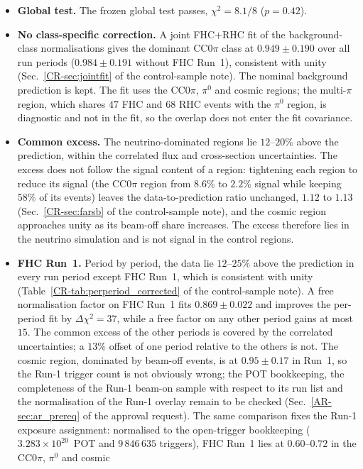\documentclass[11pt,a4paper]{article}
\newcommand{\crref}[2]{#1~\ref{CR-#2} of the control-sample note}
\begin{document}
\begin{itemize}\itemsep3pt
  \item \textbf{Global test.} The frozen global test passes, $\chi^2=8.1/8$ ($p=0.42$).
  \item \textbf{No class-specific correction.} A joint FHC$+$RHC fit of the background-class
    normalisations gives the dominant CC$0\pi$ class at $0.949\pm0.190$ over all run periods
    ($0.984\pm0.191$ without FHC Run~1), consistent with unity (\crref{Sec.}{sec:jointfit}). The
    nominal background prediction is kept. The fit uses the CC$0\pi$, $\pi^0$ and cosmic regions; the
    multi-$\pi$ region, which shares $47$ FHC and $68$ RHC events with the $\pi^0$ region, is
    diagnostic and not in the fit, so the overlap does not enter the fit covariance.
  \item \textbf{Common excess.} The neutrino-dominated regions lie $12$--$20\%$ above the prediction,
    within the correlated flux and cross-section uncertainties. The excess does not follow the
    signal content of a region: tightening each region to reduce its signal (the CC$0\pi$ region from
    $8.6\%$ to $2.2\%$ signal while keeping $58\%$ of its events) leaves the data-to-prediction ratio
    unchanged, $1.12$ to $1.13$ (\crref{Sec.}{sec:farsb}), and the cosmic region approaches unity as
    its beam-off share increases. The excess therefore lies in the neutrino simulation and is not
    signal in the control regions.
  \item \textbf{FHC Run~1.} Period by period, the data lie $12$--$25\%$ above the prediction in every
    run period except FHC Run~1, which is consistent with unity (\crref{Table}{tab:perperiod_corrected}).
    A free normalisation factor on FHC Run~1 fits $0.869\pm0.022$ and improves the per-period fit by
    $\Delta\chi^2=37$, while a free factor on any other period gains at most $15$. The common excess
    of the other periods is covered by the correlated uncertainties; a $13\%$ offset of one period
    relative to the others is not. The cosmic region, dominated by beam-off events, is at
    $0.95\pm0.17$ in Run~1, so the Run-1 trigger count is not obviously wrong; the POT bookkeeping,
    the completeness of the Run-1 beam-on sample with respect to its run list and the normalisation of
    the Run-1 overlay remain to be checked (Sec.~\ref{AR-sec:ar_prereq} of the approval request). The same comparison fixes the
    Run-1 exposure assignment: normalised to the open-trigger bookkeeping ($3.283\times10^{20}$~POT and
    $9\,846\,635$ triggers), FHC Run~1 lies at $0.60$--$0.72$ in the CC$0\pi$, $\pi^0$ and cosmic

\end{itemize}
\end{document}
